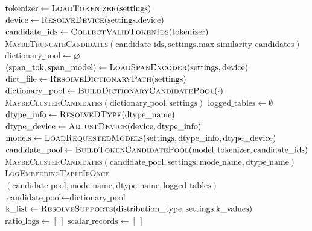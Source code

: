 \documentclass{article}
\begin{document}
\begin{algorithm}
\caption{\textsc{RunExperiment}(settings)}
\begin{algorithmic}[1]
\STATE $\text{tokenizer} \leftarrow \textsc{LoadTokenizer}(\text{settings})$
\STATE $\text{device} \leftarrow \textsc{ResolveDevice}(\text{settings.device})$
\STATE $\text{candidate\_ids} \leftarrow \textsc{CollectValidTokenIds}(\text{tokenizer})$
\STATE \textsc{MaybeTruncateCandidates}$(\text{candidate\_ids}, \text{settings.max\_similarity\_candidates})$
\STATE $\text{dictionary\_pool} \leftarrow \varnothing$
    \STATE $(\text{span\_tok}, \text{span\_model}) \leftarrow \textsc{LoadSpanEncoder}(\text{settings}, \text{device})$
    \STATE $\text{dict\_file} \leftarrow \textsc{ResolveDictionaryPath}(\text{settings})$
    \STATE $\text{dictionary\_pool} \leftarrow \textsc{BuildDictionaryCandidatePool}(\cdot)$
    \STATE \textsc{MaybeClusterCandidates}$(\text{dictionary\_pool}, \text{settings})$
\ENDIF
\STATE $\text{logged\_tables} \leftarrow \emptyset$
    \STATE $\text{dtype\_info} \leftarrow \textsc{ResolveDType}(\text{dtype\_name})$
    \STATE $\text{dtype\_device} \leftarrow \textsc{AdjustDevice}(\text{device}, \text{dtype\_info})$
    \STATE $\text{models} \leftarrow \textsc{LoadRequestedModels}(\text{settings}, \text{dtype\_info}, \text{dtype\_device})$
            \STATE $\text{candidate\_pool} \leftarrow \textsc{BuildTokenCandidatePool}(\text{model}, \text{tokenizer}, \text{candidate\_ids})$
            \STATE \textsc{MaybeClusterCandidates}$(\text{candidate\_pool}, \text{settings}, \text{mode\_name}, \text{dtype\_name})$
            \STATE \textsc{LogEmbeddingTableIfOnce}$(\text{candidate\_pool}, \text{mode\_name}, \text{dtype\_name}, \text{logged\_tables})$
        \ELSE
            \STATE $\text{candidate\_pool} \leftarrow \text{dictionary\_pool}$
        \ENDIF
            \STATE $\text{k\_list} \leftarrow \textsc{ResolveSupports}(\text{distribution\_type}, \text{settings.k\_values})$
                    \STATE $\text{ratio\_logs} \leftarrow [\,]$
                        \STATE $\text{scalar\_records} \leftarrow [\,]$

\end{algorithmic}
\end{algorithm}
\end{document}
